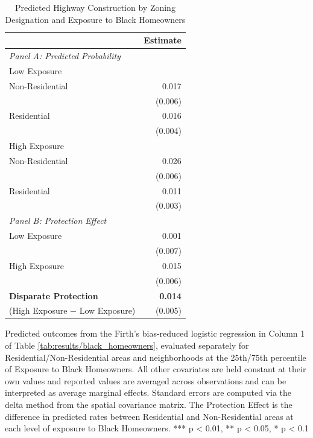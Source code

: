 \begin{table}[h]
\centering
\caption{Predicted Highway Construction by Zoning Designation and Exposure to Black Homeowners}
\label{tab:predicted_outcomes/black_homeowners}
\begin{threeparttable}
\begin{tabular}{lr@{\hspace{1.2em}}}
\toprule
 & Estimate \\
\midrule
\textit{Panel A: Predicted Probability} & \\
\addlinespace[2pt]
Low Exposure & \\
\quad Non-Residential & 0.017 \\
 & (0.006) \\[4pt]
\quad Residential & 0.016 \\
 & (0.004) \\[4pt]
High Exposure & \\
\quad Non-Residential & 0.026 \\
 & (0.006) \\[4pt]
\quad Residential & 0.011 \\
 & (0.003) \\[4pt]
\midrule
\textit{Panel B: Protection Effect} & \\
\addlinespace[2pt]
Low Exposure & 0.001 \\
 & (0.007) \\[4pt]
High Exposure & 0.015\rlap{$^{**}$} \\
 & (0.006) \\[4pt]
\addlinespace[2pt]
\textbf{Disparate Protection} & \textbf{0.014}\rlap{$^{***}$} \\
(High Exposure $-$ Low Exposure) & (0.005) \\
\bottomrule
\end{tabular}
\begin{tablenotes}[flushleft]
\footnotesize
\item Predicted outcomes from the Firth's bias-reduced logistic regression in Column 1 of Table \ref{tab:results/black_homeowners}, evaluated separately for Residential/Non-Residential areas and neighborhoods at the 25th/75th percentile of Exposure to Black Homeowners. All other covariates are held constant at their own values and reported values are averaged across observations and can be interpreted as average marginal effects. Standard errors are computed via the delta method from the spatial covariance matrix. The Protection Effect is the difference in predicted rates between Residential and Non-Residential areas at each level of exposure to Black Homeowners. *** p < 0.01, ** p < 0.05, * p < 0.1
\end{tablenotes}
\end{threeparttable}
\end{table}
